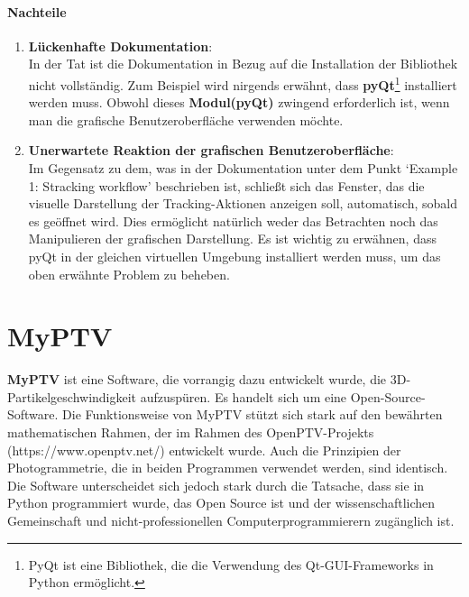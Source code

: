 	\paragraph{Nachteile}
		\begin{enumerate}
    			\item \textbf{Lückenhafte Dokumentation}:\\
				In der Tat ist die Dokumentation in Bezug auf die Installation der Bibliothek nicht vollständig. Zum Beispiel wird nirgends erwähnt, dass \textbf{pyQt}\footnote{PyQt ist eine Bibliothek, die die Verwendung des Qt-GUI-Frameworks in Python ermöglicht.} installiert werden muss. Obwohl dieses \textbf{Modul(pyQt)} zwingend erforderlich ist, wenn man die grafische Benutzeroberfläche verwenden möchte.
				
    			\item \textbf{Unerwartete Reaktion der grafischen Benutzeroberfläche}:\\
				Im Gegensatz zu dem, was in der Dokumentation unter dem Punkt `Example 1: Stracking workflow' beschrieben ist, schließt sich das Fenster, das die visuelle Darstellung der Tracking-Aktionen anzeigen soll, automatisch, sobald es geöffnet wird.  Dies ermöglicht natürlich weder das Betrachten noch das Manipulieren der grafischen Darstellung. Es ist wichtig zu erwähnen, dass pyQt in der gleichen virtuellen Umgebung installiert werden muss, um das oben erwähnte Problem zu beheben.
    			
		\end{enumerate}
		

	
\section{MyPTV}
\textbf{MyPTV} \cite{ron_shnapp_MyPTV} ist eine Software, die vorrangig dazu entwickelt wurde, die 3D-Partikel\-geschwindigkeit aufzuspüren. Es handelt sich um eine Open-Source-Software.
Die Funktionsweise von MyPTV stützt sich stark auf den bewährten mathematischen Rahmen, der im Rahmen des OpenPTV-Projekts (https://www.openptv.net/) entwickelt wurde. Auch die Prinzipien der Photogrammetrie, die in beiden Programmen verwendet werden, sind identisch. Die Software unterscheidet sich jedoch stark durch die Tatsache, dass sie in Python programmiert wurde, das Open Source ist und der wissenschaftlichen Gemeinschaft und nicht-professionellen Computerprogrammierern zugänglich ist.

